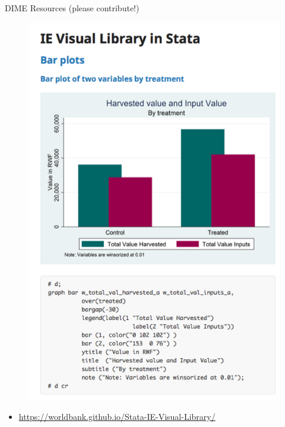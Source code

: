 \documentclass[aspectratio=169]{beamer}
\begin{document}
\begin{frame}[fragile]{DIME Resources (please contribute!)}
\begin{multicols}{2}	
	\begin{figure}
		\centering
		\includegraphics[width=\linewidth]{img/visualie}
	\end{figure}
	\begin{itemize}
		\item \url{https://worldbank.github.io/Stata-IE-Visual-Library/ }
	\end{itemize}
	\begin{figure}
		\centering

\end{figure}
\end{multicols}
\end{frame}
\end{document}
